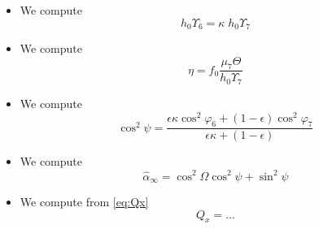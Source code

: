 \documentclass[aps,onecolumn,10pt]{revtex4}
\begin{document}
\begin{itemize}
\item We compute
\begin{equation}
	h_0 \Upsilon_6 = \kappa \; h_0 \Upsilon_7
\end{equation}

\item We compute
$$
	\eta = f_0 \dfrac{\mu_7 \Theta}{h_0\Upsilon_7}
$$

\item We compute
$$
	\cos^2\psi = \dfrac{\epsilon\kappa\cos^2\varphi_6+(1-\epsilon)\cos^2\varphi_7}{\epsilon\kappa+(1-\epsilon)} 
$$

\item We compute
$$
	\hat\alpha_\infty = \cos^2\Omega\cos^2\psi + \sin^2\psi
$$

\item We compute from \eqref{eq:Qx}
$$
	Q_x = ... %
$$

\end{itemize}
\end{document}
